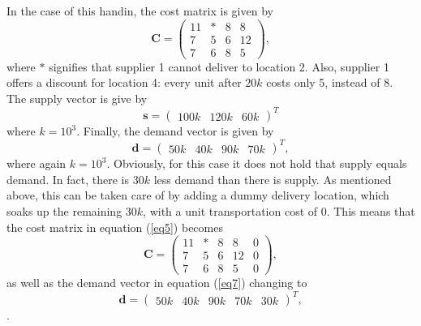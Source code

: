 \documentclass{article}
\begin{document}
  \noindent
  In the case of this handin, the cost matrix is given by
  \begin{equation}
    \mathbf{C} =
    \begin{pmatrix}
      11 & * & 8 & 8 \\
      7  & 5 & 6 & 12 \\
      7  & 6 & 8 & 5
    \end{pmatrix},
    \label{eq5}
  \end{equation}
  where $*$ signifies that supplier 1 cannot deliver to location 2. Also,
  supplier 1 offers a discount for location 4: every unit after $20k$ costs
  only 5, instead of 8.
  The supply vector is give by
  \begin{equation}
    \mathbf{s} =
    \begin{pmatrix}
      100k & 120k & 60k
    \end{pmatrix}^T
    \label{eq6}
  \end{equation}
  where $k = 10^3$. Finally, the demand vector is given by
  \begin{equation}
    \mathbf{d} =
    \begin{pmatrix}
      50k & 40k & 90k & 70k
    \end{pmatrix}^T,
    \label{eq7}
  \end{equation}
  where again $k = 10^3$. Obviously, for this case it does not hold that supply
  equals demand. In fact, there is $30k$ less demand than there is supply. As
  mentioned above, this can be taken care of by adding a dummy delivery
  location, which soaks up the remaining $30k$, with
  a unit transportation cost of $0$. This means that the cost matrix in
  equation (\ref{eq5}) becomes
  \begin{equation}
    \mathbf{C} =
    \begin{pmatrix}
      11 & * & 8 & 8  & 0\\
      7  & 5 & 6 & 12 & 0\\
      7  & 6 & 8 & 5  & 0
    \end{pmatrix},
    \label{eq8}
  \end{equation}
  as well as the demand vector in equation (\ref{eq7}) changing to
  \begin{equation}
    \mathbf{d} =
    \begin{pmatrix}
      50k & 40k & 90k & 70k & 30k
    \end{pmatrix}^T,
    \label{eq9}
  \end{equation}.
\end{document}
